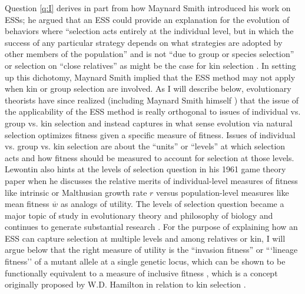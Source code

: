 \documentclass[11pt]{article}
\newcommand{\mean}[1]{\overline{#1}}
\begin{document}
Question \ref{q:I} derives in part from how Maynard Smith introduced his work on ESSs; he argued that an ESS could provide an explanation for the evolution of behaviors where ``selection acts entirely at the individual level, but in which the success of any particular strategy depends on what strategies are adopted by other members of the population'' \cite[p. 210]{Maynard-Smith:1974} and is not ``due to group or species selection'' \cite[p. 15]{Maynard-Smith:Price:1973} or selection on ``close relatives'' \cite[p. 210]{Maynard-Smith:1974} as might be the case for kin selection \cite{Hamilton:1964}. In setting up this dichotomy, Maynard Smith implied that the ESS method may not apply when kin or group selection are involved. As I will describe below, evolutionary theorists have since realized (including Maynard Smith himself \cite[p. 33]{MaynardSmith:1978}) that the issue of the applicability of the ESS method is really orthogonal to issues of individual vs. group vs. kin selection and instead captures in what sense evolution via natural selection optimizes fitness given a specific measure of fitness. Issues of individual vs. group vs. kin selection are about the ``units'' or ``levels'' at which selection acts and how fitness should be measured to account for selection at those levels. Lewontin also hints at the levels of selection question in his 1961 game theory paper when he discusses the relative merits of individual-level measures of fitness like intrinsic or Malthusian growth rate $r$ versus population-level measures like mean fitness $\mean{w}$ \cite[pp. 400-401]{Lewontin:1961} as analogs of utility. The levels of selection question became a major topic of study in evolutionary theory \cite[e.g.,][]{Lewontin:1970,Dawkins:1982,Wilson:Sober:1989,Maynard-Smith:Szathmary:1995,Wilson:1997,Michod:1999,Michod:2006,Szathmary:2015} and philosophy of biology \cite{Hull:1980,Brandon:1982,Damuth:Heisler:1988,Lloyd:1992,Lloyd:1994,Sober:Wilson:1994,Okasha:2006,Okasha:2016} and continues to generate substantial research \cite[e.g.,][]{Black:Bourrat:2020,Cooney:Mori:2022,Veit:2022}. For the purpose of explaining how an ESS can capture selection at multiple levels and among relatives or kin, I will argue below that the right measure of utility is the ``invasion fitness'' \cite{Metz:Nisbet:1992,Heino:Metz:1998} or ```lineage fitness'' \cite{Lehmann:Alger:2015,Akcay:VanCleve:2016,Lehmann:Mullon:2016} of a mutant allele at a single genetic locus, which can be shown to be functionally equivalent to a measure of inclusive fitness \cite{Lehmann:Mullon:2016,Lehmann:Rousset:2020}, which is a concept originally proposed by W.D. Hamilton in relation to kin selection \cite{Hamilton:1964}.
\end{document}

